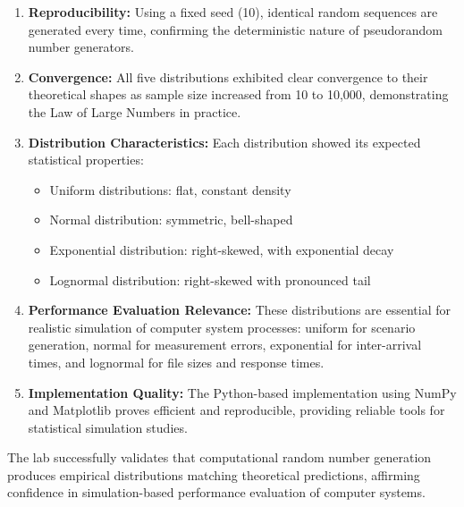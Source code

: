 \documentclass[12pt]{article}
\begin{document}
\begin{enumerate}
    \item \textbf{Reproducibility:} Using a fixed seed (10), identical random sequences are generated every time, confirming the deterministic nature of pseudorandom number generators.

    \item \textbf{Convergence:} All five distributions exhibited clear convergence to their theoretical shapes as sample size increased from 10 to 10,000, demonstrating the Law of Large Numbers in practice.

    \item \textbf{Distribution Characteristics:} Each distribution showed its expected statistical properties:
          \begin{itemize}
              \item Uniform distributions: flat, constant density
              \item Normal distribution: symmetric, bell-shaped
              \item Exponential distribution: right-skewed, with exponential decay
              \item Lognormal distribution: right-skewed with pronounced tail
          \end{itemize}

    \item \textbf{Performance Evaluation Relevance:} These distributions are essential for realistic simulation of computer system processes: uniform for scenario generation, normal for measurement errors, exponential for inter-arrival times, and lognormal for file sizes and response times.

    \item \textbf{Implementation Quality:} The Python-based implementation using NumPy and Matplotlib proves efficient and reproducible, providing reliable tools for statistical simulation studies.
\end{enumerate}

The lab successfully validates that computational random number generation produces empirical distributions matching theoretical predictions, affirming confidence in simulation-based performance evaluation of computer systems.
\end{document}
